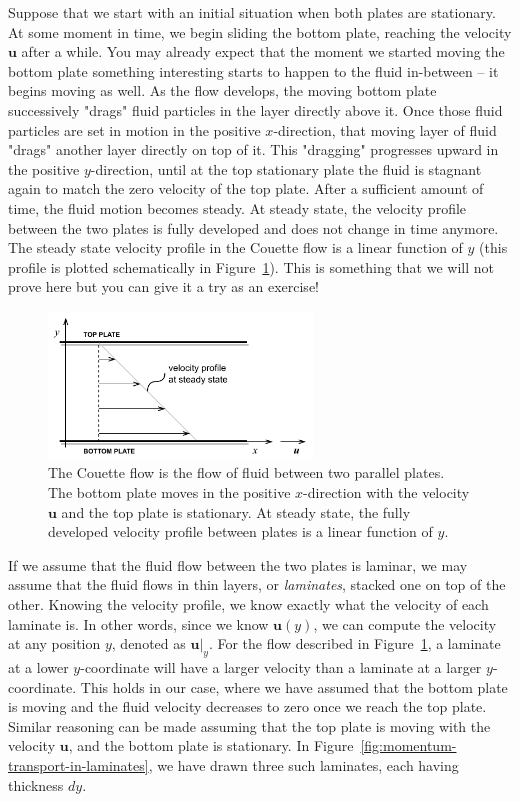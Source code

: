 \documentclass[10pt,twocolumn]{article}
\begin{document}
Suppose that we start with an initial situation when both plates are stationary. At some moment in time, we begin sliding the bottom plate, reaching the velocity $\mathbf{u}$ after a while. You may already expect that the moment we started moving the bottom plate something interesting starts to happen to the fluid in-between -- it begins moving as well. As the flow develops, the moving bottom plate successively "drags" fluid particles in the layer directly above it. Once those fluid particles are set in motion in the positive $x$-direction, that moving layer of fluid "drags" another layer directly on top of it. This "dragging" progresses upward in the positive $y$-direction, until at the top stationary plate the fluid is stagnant again to match the zero velocity of the top plate. 
After a sufficient amount of time, the fluid motion becomes steady. At steady state, the velocity profile between the two plates is fully developed and does not change in time anymore. The steady state velocity profile in the Couette flow is a linear function of $y$ (this profile is plotted schematically in Figure~\ref{fig:couette-flow}). This is something that we will not prove here but you can give it a try as an exercise!
\begin{figure}[t!]
\centering\includegraphics[width=7cm]{couette-flow.pdf}
\caption{The Couette flow is the flow of fluid between two parallel plates. The bottom plate moves in the positive $x$-direction with the velocity $\mathbf{u}$ and the top plate is stationary. At steady state, the fully developed velocity profile between plates is a linear function of $y$.}
\label{fig:couette-flow}
\end{figure}

If we assume that the fluid flow between the two plates is laminar, we may assume that the fluid flows in thin layers, or \textit{laminates}, stacked one on top of the other. Knowing the velocity profile, we know exactly what the velocity of each laminate is. In other words, since we know $\mathbf{u}(y)$, we can compute the velocity at any position $y$, denoted as $\mathbf{u}|_{y}$. For the flow described in Figure~\ref{fig:couette-flow}, a laminate at a lower $y$-coordinate will have a larger velocity than a laminate at a larger $y$-coordinate. This holds in our case, where we have assumed that the bottom plate is moving and the fluid velocity decreases to zero once we reach the top plate. Similar reasoning can be made assuming that the top plate is moving with the velocity $\mathbf{u}$, and the bottom plate is stationary. In Figure~\ref{fig:momentum-transport-in-laminates}, we have drawn three such laminates, each having thickness $dy$.
\end{document}

